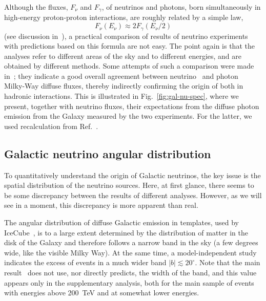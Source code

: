 \documentclass[a4paper,noshowpacs,noshowkeys,floatfix,twocolumn,preprintnumbers,nofootinbib]{revtex4-2}
\begin{document}
Although the fluxes, $F_{\nu}$ and $F_{\gamma}$, of neutrinos and photons, born simultaneously in high-energy proton-proton interactions, are roughly related by a simple law,
$$
F_\nu(E_\nu)\approx 2F_\gamma(E_\nu/2)
$$
(see discussion in~\cite{ST-UFN}), a practical comparison of results of neutrino experiments with predictions based on this formula are not easy. The point again is that the analyses refer to different areas of the sky and to different energies, and are obtained by different methods. Some attempts of such a comparison were made in~\cite{neutgalaxy, nu-gamma-gal1,nu-gamma-gal2, nu-gamma-gal3}; they indicate a good overall agreement between neutrino~\cite{neutgalaxy, ANTARES-ridge,IceCube-gal-Science} and photon~\cite{TibetDiffuseGal,LHAASODiffuseGal} Milky-Way diffuse fluxes, thereby indirectly confirming the origin of both in hadronic interactions. This is illustrated in Fig.~\ref{fig:gal-nu-spec}, where we present, together with neutrino fluxes, their expectations from the diffuse photon emission from the Galaxy measured by the two experiments. For the latter, we used recalculation from Ref.~\cite{nu-gamma-gal2}.

\subsection{Galactic neutrino angular distribution}
\label{sec:gal:width}
To quantitatively understand the origin of Galactic neutrinos, the key issue is the spatial distribution of the neutrino sources. Here, at first glance, there seems to be some discrepancy between the results of different analyses. However, as we will see in a moment, this discrepancy is more apparent than real.

The angular distribution of diffuse Galactic emission in templates, used by IceCube~\cite{IceCube-gal-Science}, is to a large extent determined by the distribution of matter in the disk of the Galaxy and therefore follows a narrow band in the sky (a few degrees wide, like the visible Milky Way). At the same time, a model-independent study~\cite{neutgalaxy} indicates the excess of events in a much wider band $|b| \lesssim 20^{\circ}$. Note that the main result~\cite{neutgalaxy} does not use, nor directly predicts, the width of the band, and this value appears only in the supplementary analysis, both for the main sample of events with energies above 200~TeV and at somewhat lower energies.
\end{document}
